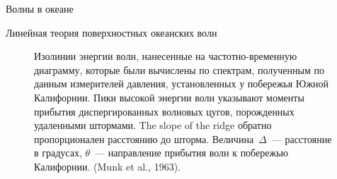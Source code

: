 \begin{chapter}{Волны в океане}
\begin{section}{Линейная теория поверхностных океанских волн}
\begin{figure}[t!]
\caption{Изолинии энергии волн, нанесенные на частотно-временную диаграмму,
которые были вычислены по спектрам, полученным по данным измерителей давления,
установленных у побережья Южной Калифорнии. Пики высокой энергии волн
указывают моменты прибытия диспергированных волновых цугов, порожденных 
удаленными штормами. The slope of the ridge обратно пропорционален 
расстоянию до шторма. Величина~$\Delta$~--- расстояние в градусах, 
$\theta$~--- направление прибытия волн к побережью Калифорнии. 
(Munk et al., 1963).}
\label{fig:dispersedwaves}
\end{figure}
%


\end{section}
\end{chapter}
